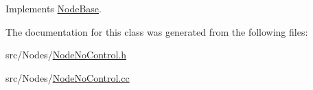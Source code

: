 Implements \hyperlink{class_node_base_ae70b168f2bc7407c249594b1c614301c}{Node\+Base}.



The documentation for this class was generated from the following files\+:\begin{DoxyCompactItemize}
\item 
src/\+Nodes/\hyperlink{_node_no_control_8h}{Node\+No\+Control.\+h}\item 
src/\+Nodes/\hyperlink{_node_no_control_8cc}{Node\+No\+Control.\+cc}\end{DoxyCompactItemize}
